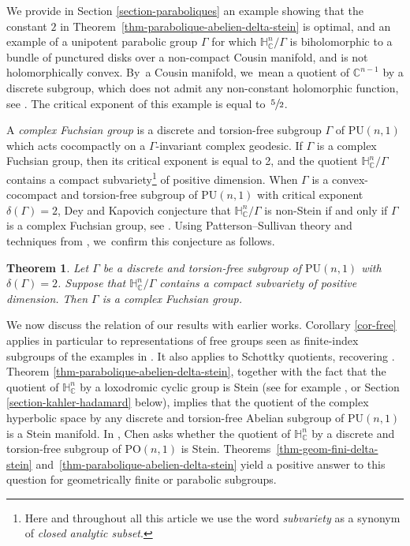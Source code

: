 \documentclass[11pt]{article}
\newtheorem{theoremIntro}{Theorem}
\theoremstyle{definition}
\newcommand{\C}{\mathbb{C}}
\newcommand{\HNC}{\mathbb{H}^{n}_{\C}}
\newcommand{\PU}{\mathrm{PU}}
\newcommand{\PO}{\mathrm{PO}}
\def\C{\mathbb{C}}
\newcommand{\HNC}{\mathbb{H}^{n}_{\C}}
\newcommand{\PU}{\mathrm{PU}}
\begin{document}
We provide in Section \ref{section-paraboliques} an example showing that the constant $2$ in Theorem~\ref{thm-parabolique-abelien-delta-stein} is optimal, and an example of a unipotent parabolic group $\Gamma$ for which $\HNC/\Gamma$ is biholomorphic to a bundle of punctured disks over a non-compact Cousin manifold, and is not holomorphically convex. By~a Cousin manifold, we~mean a quotient of $\C^{n-1}$ by a discrete subgroup, which does not admit any non-constant holomorphic function, see \cite{cousinFonctionsTriplementPeriodiques1910,kopfermannMaximaleUntergruppenAbelscher1964,abeToroidalGroups2001}. The critical exponent of this example is equal to~$\sfrac{5}{2}$.

A \textit{complex Fuchsian group} is a discrete and torsion-free subgroup $\Gamma$ of $\PU(n,1)$ which acts cocompactly on a $\Gamma$\nobreakdash-invariant complex geodesic. If $\Gamma$ is a complex Fuchsian group, then its critical exponent is equal to 2, and the quotient $\HNC/\Gamma$ contains a compact subvariety\footnote{Here and throughout all this article we use the word \textit{subvariety} as a synonym of \textit{closed analytic subset}.} of positive dimension. When $\Gamma$ is a convex-cocompact and torsion-free subgroup of $\PU(n,1)$ with critical exponent $\delta(\Gamma)=2$, Dey and Kapovich conjecture that $\HNC/\Gamma$ is non-Stein if and only if $\Gamma$ is a complex Fuchsian group, see \cite[Conj.\,17]{deyNoteComplexhyperbolicKleinian2020}. Using Patterson--Sullivan theory and techniques from \cite{connellNaturalFlowCritical2023}, we~confirm this conjecture as follows.

\begin{theoremIntro}\label{thm-delta2}
Let $\Gamma$ be a discrete and torsion-free subgroup of $\PU(n,1)$ with $\delta(\Gamma)=2$. Suppose that $\HNC/\Gamma$ contains a compact subvariety of positive dimension. Then $\Gamma$ is a complex Fuchsian group.
\end{theoremIntro}

We now discuss the relation of our results with earlier works. Corollary \ref{cor-free} applies in particular to representations of free groups seen as finite-index subgroups of the examples in \cite{goldmanComplexHyperbolicIdeal1992,falbelModuliSpaceModular2003}. It also applies to Schottky quotients, recovering \cite[Th.\,4.3]{miebachSchottkyGroupActions2018}. Theorem \ref{thm-parabolique-abelien-delta-stein}, together with the fact that the quotient of $\HNC$ by a loxodromic cyclic group is Stein (see for example \cite{defabritiisFamilyComplexManifolds1998manuel}, \cite{chenDiscreteGroupsHolomorphic2013} or Section \ref{section-kahler-hadamard} below), implies that the quotient of the complex hyperbolic space by any discrete and torsion-free Abelian subgroup of $\PU(n,1)$ is a Stein manifold. In \cite{chenDiscreteGroupsHolomorphic2013}, Chen asks whether the quotient of $\HNC$ by a discrete and torsion-free subgroup of $\PO(n,1)$ is Stein. Theorems~\ref{thm-geom-fini-delta-stein} and~\ref{thm-parabolique-abelien-delta-stein} yield a positive answer to this question for geometrically finite or parabolic subgroups.
\end{document}
